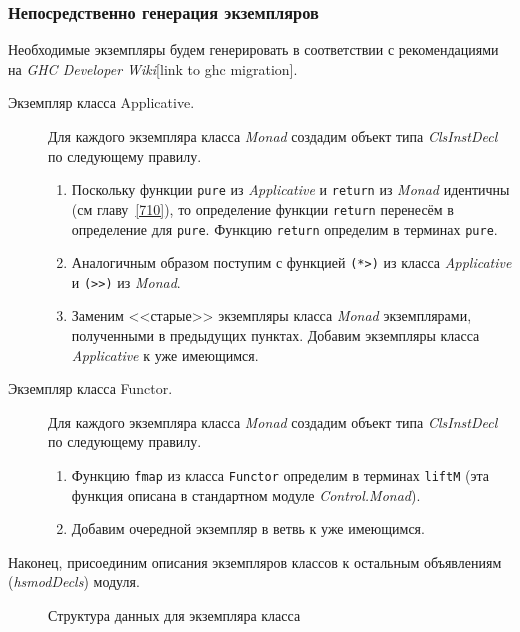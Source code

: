 \subsubsection{Непосредственно генерация экземпляров}\label{instgen}
Необходимые экземпляры будем генерировать в соответствии с рекомендациями на \textit{GHC Developer Wiki}[link to ghc migration].
\begin{description}
\item[Экземпляр класса Applicative.] Для каждого экземпляра класса \textit{Monad} создадим объект типа \textit{ClsInstDecl} по следующему правилу.
    \begin{enumerate}
        \item Поскольку функции \lstinline{pure} из \textit{Applicative} и \lstinline{return} из \textit{Monad} идентичны (см главу~\ref{710}), то определение функции \lstinline{return} перенесём в определение для \lstinline{pure}. Функцию \lstinline{return} определим в терминах \lstinline{pure}.
        \item Аналогичным образом поступим с функцией \lstinline{(*>)} из класса \textit{Applicative} и \lstinline{(>>)} из \textit{Monad}.
        \item Заменим <<старые>> экземпляры класса \textit{Monad} экземплярами, полученными в предыдущих пунктах. Добавим экземпляры класса \textit{Applicative} к уже имеющимся.
    \end{enumerate}
\item[Экземпляр класса Functor.] Для каждого экземпляра класса \textit{Monad} создадим объект типа \textit{ClsInstDecl} по следующему правилу.
    \begin{enumerate}
        \item Функцию \lstinline{fmap} из класса \lstinline{Functor} определим в терминах \lstinline{liftM} (эта функция описана в стандартном модуле \textit{Control.Monad}).
        \item Добавим очередной экземпляр в ветвь к уже имеющимся.
    \end{enumerate}
\end{description}

Наконец, присоединим описания экземпляров классов к остальным объявлениям (\textit{hsmodDecls}) модуля.

\begin{figure}[h]
\caption{Структура данных для экземпляра класса}\label{instance}
\end{figure}

